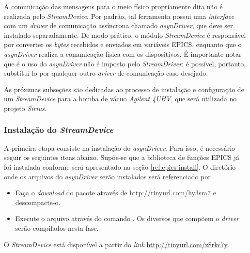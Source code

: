 \vspace{12pt}

A comunicação das mensagens para o meio físico propriamente dita não é realizada
pelo \textit{StreamDevice}. Por padrão, tal ferramenta possui uma
\textit{interface} com um \textit{driver} de comunicação assíncrona chamado
\textit{asynDriver}, que deve ser instalado separadamente. De modo prático, o
módulo \textit{StreamDevice} é responsável por converter os \textit{bytes}
recebidos e enviados em variáveis EPICS, enquanto que o \textit{asynDriver}
realiza a comunicação física com os dispositivos. É importante notar que é
o uso do \textit{asynDriver} não é imposto pelo \textit{StreamDriver}: é
possível, portanto, substituí-lo por qualquer outro \textit{driver} de
comunicação caso desejado.

\vspace{12pt}

As próximas subseções são dedicadas ao processo de instalação e configuração de
um \textit{StreamDevice} para a bomba de vácuo \textit{Agilent 4UHV}, que será
utilizada no projeto \textit{Sirius}.

\subsubsection{Instalação do \textit{StreamDevice}}

A primeira etapa consiste na instalação do \textit{asynDriver}. Para isso, é
necessário seguir os seguintes itens abaixo. Supõe-se que a biblioteca de
funções EPICS já foi instalada conforme será apresentado na seção
\ref{ref:epics-install}. O diretório onde os arquivos do \textit{asynDriver}
serão instalados será referenciado por .

\begin{itemize}
  \renewcommand\labelitemi{--}
  \item Faça o \textit{download} do pacote através de 
  \url{http://tinyurl.com/hy3sra7} e descompacte-o.
  \item Execute o arquivo  através do comando . Os
  diversos que compõem o \textit{driver} serão compilados nesta fase.
\end{itemize}

O \textit{StreamDevice} está disponível a partir do \textit{link}
\url{http://tinyurl.com/z8rkc7y}.

